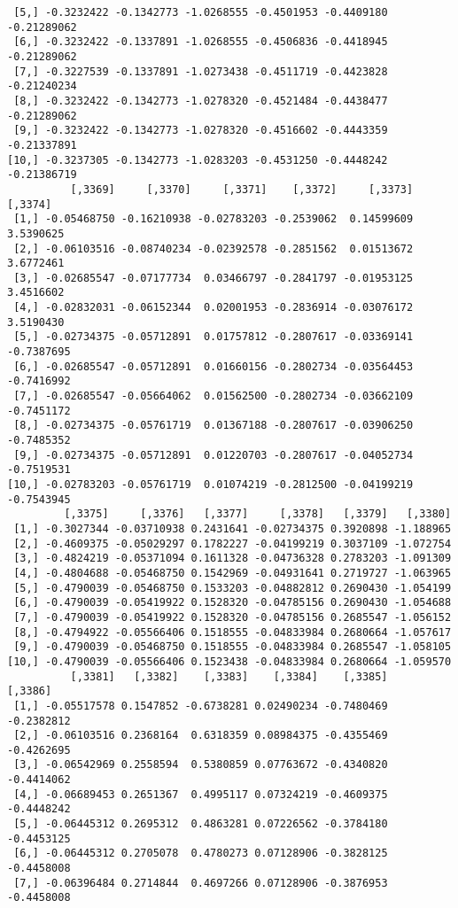 \documentclass[
  letterpaper,
  DIV=11,
  numbers=noendperiod]{scrreprt}
\begin{document}
\begin{verbatim}
 [5,] -0.3232422 -0.1342773 -1.0268555 -0.4501953 -0.4409180 -0.21289062
 [6,] -0.3232422 -0.1337891 -1.0268555 -0.4506836 -0.4418945 -0.21289062
 [7,] -0.3227539 -0.1337891 -1.0273438 -0.4511719 -0.4423828 -0.21240234
 [8,] -0.3232422 -0.1342773 -1.0278320 -0.4521484 -0.4438477 -0.21289062
 [9,] -0.3232422 -0.1342773 -1.0278320 -0.4516602 -0.4443359 -0.21337891
[10,] -0.3237305 -0.1342773 -1.0283203 -0.4531250 -0.4448242 -0.21386719
          [,3369]     [,3370]     [,3371]    [,3372]     [,3373]    [,3374]
 [1,] -0.05468750 -0.16210938 -0.02783203 -0.2539062  0.14599609  3.5390625
 [2,] -0.06103516 -0.08740234 -0.02392578 -0.2851562  0.01513672  3.6772461
 [3,] -0.02685547 -0.07177734  0.03466797 -0.2841797 -0.01953125  3.4516602
 [4,] -0.02832031 -0.06152344  0.02001953 -0.2836914 -0.03076172  3.5190430
 [5,] -0.02734375 -0.05712891  0.01757812 -0.2807617 -0.03369141 -0.7387695
 [6,] -0.02685547 -0.05712891  0.01660156 -0.2802734 -0.03564453 -0.7416992
 [7,] -0.02685547 -0.05664062  0.01562500 -0.2802734 -0.03662109 -0.7451172
 [8,] -0.02734375 -0.05761719  0.01367188 -0.2807617 -0.03906250 -0.7485352
 [9,] -0.02734375 -0.05712891  0.01220703 -0.2807617 -0.04052734 -0.7519531
[10,] -0.02783203 -0.05761719  0.01074219 -0.2812500 -0.04199219 -0.7543945
         [,3375]     [,3376]   [,3377]     [,3378]   [,3379]   [,3380]
 [1,] -0.3027344 -0.03710938 0.2431641 -0.02734375 0.3920898 -1.188965
 [2,] -0.4609375 -0.05029297 0.1782227 -0.04199219 0.3037109 -1.072754
 [3,] -0.4824219 -0.05371094 0.1611328 -0.04736328 0.2783203 -1.091309
 [4,] -0.4804688 -0.05468750 0.1542969 -0.04931641 0.2719727 -1.063965
 [5,] -0.4790039 -0.05468750 0.1533203 -0.04882812 0.2690430 -1.054199
 [6,] -0.4790039 -0.05419922 0.1528320 -0.04785156 0.2690430 -1.054688
 [7,] -0.4790039 -0.05419922 0.1528320 -0.04785156 0.2685547 -1.056152
 [8,] -0.4794922 -0.05566406 0.1518555 -0.04833984 0.2680664 -1.057617
 [9,] -0.4790039 -0.05468750 0.1518555 -0.04833984 0.2685547 -1.058105
[10,] -0.4790039 -0.05566406 0.1523438 -0.04833984 0.2680664 -1.059570
          [,3381]   [,3382]    [,3383]    [,3384]    [,3385]    [,3386]
 [1,] -0.05517578 0.1547852 -0.6738281 0.02490234 -0.7480469 -0.2382812
 [2,] -0.06103516 0.2368164  0.6318359 0.08984375 -0.4355469 -0.4262695
 [3,] -0.06542969 0.2558594  0.5380859 0.07763672 -0.4340820 -0.4414062
 [4,] -0.06689453 0.2651367  0.4995117 0.07324219 -0.4609375 -0.4448242
 [5,] -0.06445312 0.2695312  0.4863281 0.07226562 -0.3784180 -0.4453125
 [6,] -0.06445312 0.2705078  0.4780273 0.07128906 -0.3828125 -0.4458008
 [7,] -0.06396484 0.2714844  0.4697266 0.07128906 -0.3876953 -0.4458008

\end{verbatim}
\end{document}
